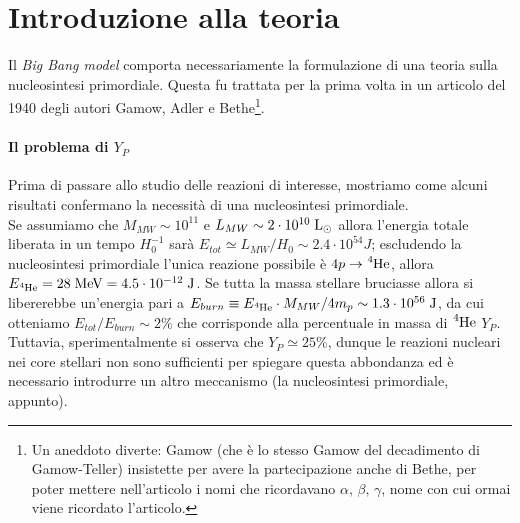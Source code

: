 \section{Introduzione alla teoria}
Il \textit{Big Bang model} comporta necessariamente la formulazione di una teoria sulla nucleosintesi primordiale. Questa fu trattata per la prima volta in un articolo del 1940 degli autori Gamow, Adler e Bethe\footnote{Un aneddoto diverte: Gamow (che è lo stesso Gamow del decadimento di Gamow-Teller) insistette per avere la partecipazione anche di Bethe, per poter mettere nell'articolo i nomi  che ricordavano $\alpha,\,\beta,\,\gamma$, nome con cui ormai viene ricordato l'articolo.}.

\paragraph{Il problema di $Y_P$} Prima di passare allo studio delle reazioni di interesse, mostriamo come alcuni risultati confermano la necessità di una nucleosintesi primordiale.\\
Se assumiamo che $M_{MW} \sim 10^{11}$ \Msol e $L_{MW}\sim 2\cdot 10^{10}\;\mbox{L}_{\odot} {}$ allora l'energia totale liberata in un tempo $H_0^{-1}$ sarà $E_{tot} \simeq L_{MW}/H_0\sim 2.4\cdot 10^{54}\unit{J}$; escludendo la nucleosintesi primordiale l'unica reazione possibile è $4p\to\ce{^4He}$, allora $E_{\ce{^4He}} = 28\unit{MeV}= 4.5 \cdot \ord{-12}\unit{J}$. Se tutta la massa stellare bruciasse allora si libererebbe un'energia pari a $E_{burn} \equiv E_{\ce{^4He}}\cdot M_{MW}/4m_p\sim 1.3\cdot \ord{56}\unit{J}$, da cui otteniamo $E_{tot}/E_{burn}\sim 2\%$ che corrisponde alla percentuale in massa di $\ce{^4He}$  $Y_P$. Tuttavia, sperimentalmente si osserva che $Y_P\simeq 25\%$, dunque le reazioni nucleari nei core stellari non sono sufficienti per spiegare questa abbondanza ed è necessario introdurre un altro meccanismo (la nucleosintesi primordiale, appunto).


